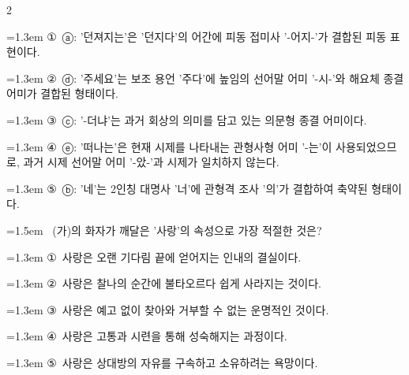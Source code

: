 \documentclass[10pt, a4paper]{article}
\begin{document}
\begin{multicols}{2}
\begin{minipage}{\columnwidth}
\vspace{0.5mm}
{\hangindent=1.3em  \noindent\hspace{0.3em}①~ⓐ: '던져지는'은 '던지다'의 어간에 피동 접미사 '-어지-'가 결합된 피동 표현이다.\par}
{\hangindent=1.3em  \noindent\hspace{0.3em}②~ⓓ: '주세요'는 보조 용언 '주다'에 높임의 선어말 어미 '-시-'와 해요체 종결 어미가 결합된 형태이다.\par}
{\hangindent=1.3em  \noindent\hspace{0.3em}③~ⓒ: '-더냐'는 과거 회상의 의미를 담고 있는 의문형 종결 어미이다.\par}
{\hangindent=1.3em  \noindent\hspace{0.3em}④~ⓔ: '떠나는'은 현재 시제를 나타내는 관형사형 어미 '-는'이 사용되었으므로, 과거 시제 선어말 어미 '-았-'과 시제가 일치하지 않는다.\par}
{\hangindent=1.3em  \noindent\hspace{0.3em}⑤~ⓑ: '네'는 2인칭 대명사 '너'에 관형격 조사 '의'가 결합하여 축약된 형태이다.\par}
\vspace{4mm}
\end{minipage}
\par

\noindent\begin{minipage}{\columnwidth}
\vspace{2mm}
{\hangindent=1.5em  ~(가)의 화자가 깨달은 '사랑'의 속성으로 가장 적절한 것은?\par}

\vspace{0.5mm}
{\hangindent=1.3em  \noindent\hspace{0.3em}①~사랑은 오랜 기다림 끝에 얻어지는 인내의 결실이다.\par}
{\hangindent=1.3em  \noindent\hspace{0.3em}②~사랑은 찰나의 순간에 불타오르다 쉽게 사라지는 것이다.\par}
{\hangindent=1.3em  \noindent\hspace{0.3em}③~사랑은 예고 없이 찾아와 거부할 수 없는 운명적인 것이다.\par}
{\hangindent=1.3em  \noindent\hspace{0.3em}④~사랑은 고통과 시련을 통해 성숙해지는 과정이다.\par}
{\hangindent=1.3em  \noindent\hspace{0.3em}⑤~사랑은 상대방의 자유를 구속하고 소유하려는 욕망이다.\par}
\vspace{4mm}
\end{minipage}
\par


\end{multicols}
\end{document}
